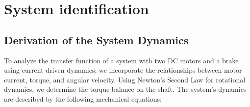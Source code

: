 \setcounter{secnumdepth}{2}

\chapter{System identification}
\label{section:identification}

\section{Derivation of the System Dynamics}

To analyze the transfer function of a system with two DC motors and a brake using current-driven dynamics, we incorporate the relationships between motor current, torque, and angular velocity. Using Newton's Second Law for rotational dynamics, we determine the torque balance on the shaft. The system's dynamics are described by the following mechanical equations:

